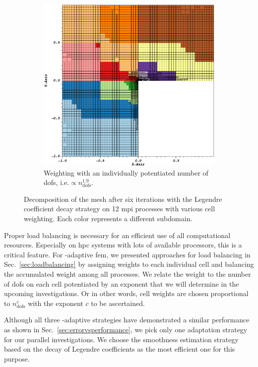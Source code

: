 \begin{figure}
\begin{subfigure}[t]{.49\textwidth}
  \includegraphics[width=\textwidth]{figures/results/corner-2d-error-hp-legendre-05_subdomain12_customweighting.png}
  \caption{Weighting with an individually potentiated number of \glspl{dof}, i.e.\@ $\propto n_\text{dofs}^{1.9}$.}
\end{subfigure}
\caption{Decomposition of the mesh after six iterations with the Legendre coefficient decay strategy on 12 \gls{mpi} processes with various cell weighting. Each color represents a different subdomain.}
\label{fig:decomposition}
\end{figure}

Proper load balancing is necessary for an efficient use of all computational resources. Especially on \gls{hpc} systems with lots of available processors, this is a critical feature. For \hp-adaptive \gls{fem}, we presented approaches for load balancing in Sec.~\ref{sec:loadbalancing} by assigning weights to each individual cell and balancing the accumulated weight among all processes. We relate the weight to the number of \glspl{dof} on each cell potentiated by an exponent that we will determine in the upcoming investigations. Or in other words, cell weights are chosen proportional to $n_\text{dofs}^c$ with the exponent $c$ to be ascertained.

Although all three \hp-adaptive strategies have demonstrated a similar performance as shown in Sec.~\ref{sec:errorvsperformance}, we pick only one adaptation strategy for our parallel investigations. We choose the smoothness estimation strategy based on the decay of Legendre coefficients as the most efficient one for this purpose.

